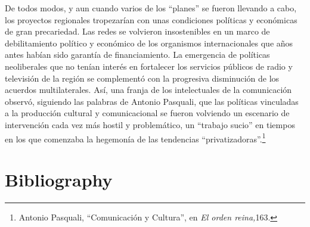 \documentclass{tufte-handout}
\begin{document}
De todos modos, y aun cuando varios de los ``planes'' se fueron llevando
a cabo, los proyectos regionales tropezarían con unas condiciones
políticas y económicas de gran precariedad. Las redes se volvieron
insostenibles en un marco de debilitamiento político y económico de los
organismos internacionales que años antes habían sido garantía de
financiamiento. La emergencia de políticas neoliberales que no tenían
interés en fortalecer los servicios públicos de radio y televisión de la
región se complementó con la progresiva disminución de los acuerdos
multilaterales. Así, una franja de los intelectuales de la comunicación
observó, siguiendo las palabras de Antonio Pasquali, que las políticas
vinculadas a la producción cultural y comunicacional se fueron volviendo
un escenario de intervención cada vez más hostil y problemático, un
``trabajo sucio'' en tiempos en los que comenzaba la hegemonía de las
tendencias ``privatizadoras''.\footnote{Antonio Pasquali, ``Comunicación
  y Cultura'', en \emph{El orden reina,}163.}

\vspace*{2em}


\section{Bibliography}\label{bibliography}
\end{document}
